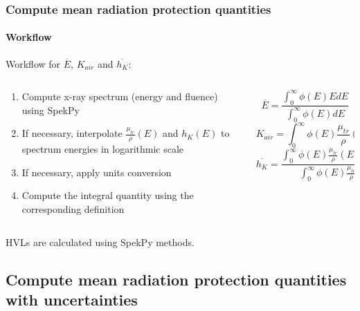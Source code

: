 \documentclass{beamer}
\newcommand{\highlight}[1]{{\color{blue} #1}}
\begin{document}
	\begin{frame}
		\frametitle{Compute mean radiation protection quantities}
		\framesubtitle{Workflow}
		Workflow for $\overline{E}$, $K_{air}$ and $\overline{h_K}$:
		\begin{columns}
			\begin{column}{0.55\textwidth}
				\begin{enumerate}
					\item Compute x-ray \highlight{spectrum} (energy and fluence) using SpekPy
					\item If necessary, \highlight{interpolate} $\frac{\mu_{tr}}{\rho}(E)$ and $h_K(E)$ to spectrum energies in logarithmic scale
					\item If necessary, apply \highlight{units} conversion
					\item Compute the \highlight{integral quantity} using the corresponding definition
				\end{enumerate}
			\end{column}
			\begin{column}{0.4\textwidth}
				\small
				$$\overline{E}=\frac{\int_{0}^{\infty}\phi(E)EdE}{\int_{0}^{\infty}\phi(E)dE}$$
				$$K_{air}=\int_{0}^{\infty}\phi(E)\frac{\mu_{tr}}{\rho}(E)EdE$$
				$$\overline{h_K}=\frac{\int_{0}^{\infty}\phi(E)\frac{\mu_{tr}}{\rho}(E)h_K(E)EdE}{\int_{0}^{\infty}\phi(E)\frac{\mu_{tr}}{\rho}(E)EdE}$$
			\end{column}
		\end{columns}
		\bigskip
		\highlight{HVLs} are calculated using SpekPy methods.
	\end{frame}
	
	\subsection{Compute mean radiation protection quantities with uncertainties}
	
\end{document}
